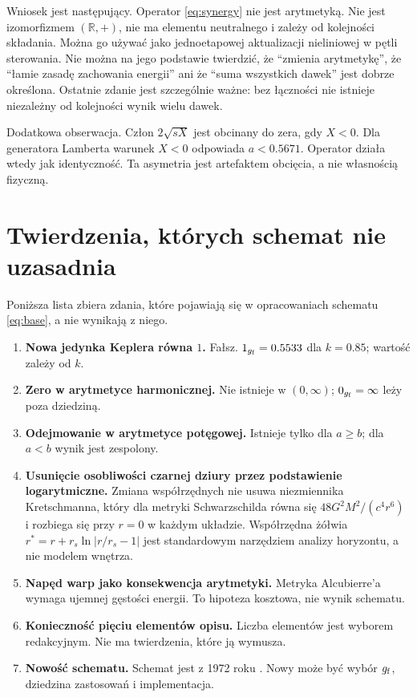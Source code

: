 \documentclass[11pt,a4paper]{article}
\begin{document}
Wniosek jest następujący. Operator \eqref{eq:synergy} nie jest arytmetyką.
Nie jest izomorfizmem $(\mathbb{R},+)$, nie ma elementu neutralnego i zależy od
kolejności składania. Można go używać jako jednoetapowej aktualizacji
nieliniowej w pętli sterowania. Nie można na jego podstawie twierdzić, że
\enquote{zmienia arytmetykę}, że \enquote{łamie zasadę zachowania energii} ani że
\enquote{suma wszystkich dawek} jest dobrze określona. Ostatnie zdanie jest
szczególnie ważne: bez łączności nie istnieje niezależny od kolejności wynik
wielu dawek.

Dodatkowa obserwacja. Człon $2\sqrt{sX}$ jest obcinany do zera, gdy $X<0$.
Dla generatora Lamberta warunek $X<0$ odpowiada $a<0.5671$. Operator działa
wtedy jak identyczność. Ta asymetria jest artefaktem obcięcia, a nie
własnością fizyczną.

\section{Twierdzenia, których schemat nie uzasadnia}

Poniższa lista zbiera zdania, które pojawiają się w opracowaniach schematu
\eqref{eq:base}, a nie wynikają z niego.

\begin{enumerate}[leftmargin=1.6em]
  \item \textbf{Nowa jedynka Keplera równa $1$.} Fałsz. $1_{g_{\mathrm{f}}}=0.5533$ dla
        $k=0.85$; wartość zależy od $k$.
  \item \textbf{Zero w arytmetyce harmonicznej.} Nie istnieje w $(0,\infty)$;
        $0_{g_{\mathrm{f}}}=\infty$ leży poza dziedziną.
  \item \textbf{Odejmowanie w arytmetyce potęgowej.} Istnieje tylko dla
        $a\ge b$; dla $a<b$ wynik jest zespolony.
  \item \textbf{Usunięcie osobliwości czarnej dziury przez podstawienie
        logarytmiczne.} Zmiana współrzędnych nie usuwa niezmiennika
        Kretschmanna, który dla metryki Schwarzschilda równa się
        $48G^{2}M^{2}/(c^{4}r^{6})$ i rozbiega się przy $r=0$ w każdym układzie.
        Współrzędna żółwia $r^{*}=r+r_{s}\ln|r/r_{s}-1|$ jest standardowym
        narzędziem analizy horyzontu, a nie modelem wnętrza.
  \item \textbf{Napęd warp jako konsekwencja arytmetyki.} Metryka Alcubierre'a
        wymaga ujemnej gęstości energii. To hipoteza kosztowa, nie wynik
        schematu.
  \item \textbf{Konieczność pięciu elementów opisu.} Liczba elementów jest
        wyborem redakcyjnym. Nie ma twierdzenia, które ją wymusza.
  \item \textbf{Nowość schematu.} Schemat jest z 1972 roku
        \cite{grossman1972}. Nowy może być wybór $g_{\mathrm{f}}$, dziedzina zastosowań
        i implementacja.
\end{enumerate}
\end{document}
